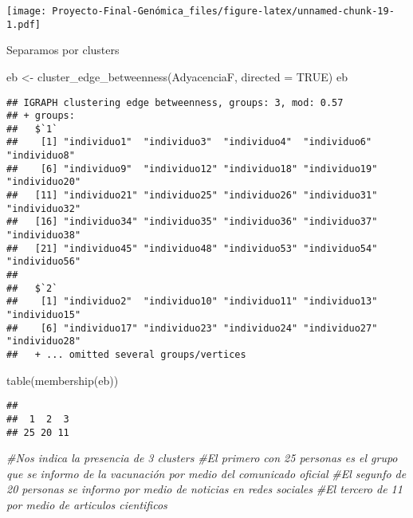 \documentclass[
]{article}
\newenvironment{Shaded}{\begin{snugshade}}{\end{snugshade}}
\newcommand{\AttributeTok}[1]{\textcolor[rgb]{0.77,0.63,0.00}{#1}}
\newcommand{\CommentTok}[1]{\textcolor[rgb]{0.56,0.35,0.01}{\textit{#1}}}
\newcommand{\ConstantTok}[1]{\textcolor[rgb]{0.00,0.00,0.00}{#1}}
\newcommand{\FunctionTok}[1]{\textcolor[rgb]{0.00,0.00,0.00}{#1}}
\newcommand{\NormalTok}[1]{#1}
\newcommand{\OtherTok}[1]{\textcolor[rgb]{0.56,0.35,0.01}{#1}}
\begin{document}
\texttt{[image: Proyecto-Final-Genómica\_files/figure-latex/unnamed-chunk-19-1.pdf]}

Separamos por clusters

\begin{Shaded}
\begin{Highlighting}[]
\NormalTok{eb }\OtherTok{\textless{}{-}} \FunctionTok{cluster\_edge\_betweenness}\NormalTok{(AdyacenciaF, }\AttributeTok{directed =} \ConstantTok{TRUE}\NormalTok{)}
\NormalTok{eb}
\end{Highlighting}
\end{Shaded}

\begin{verbatim}
## IGRAPH clustering edge betweenness, groups: 3, mod: 0.57
## + groups:
##   $`1`
##    [1] "individuo1"  "individuo3"  "individuo4"  "individuo6"  "individuo8" 
##    [6] "individuo9"  "individuo12" "individuo18" "individuo19" "individuo20"
##   [11] "individuo21" "individuo25" "individuo26" "individuo31" "individuo32"
##   [16] "individuo34" "individuo35" "individuo36" "individuo37" "individuo38"
##   [21] "individuo45" "individuo48" "individuo53" "individuo54" "individuo56"
##   
##   $`2`
##    [1] "individuo2"  "individuo10" "individuo11" "individuo13" "individuo15"
##    [6] "individuo17" "individuo23" "individuo24" "individuo27" "individuo28"
##   + ... omitted several groups/vertices
\end{verbatim}

\begin{Shaded}
\begin{Highlighting}[]
\FunctionTok{table}\NormalTok{(}\FunctionTok{membership}\NormalTok{(eb))}
\end{Highlighting}
\end{Shaded}

\begin{verbatim}
## 
##  1  2  3 
## 25 20 11
\end{verbatim}

\begin{Shaded}
\begin{Highlighting}[]
\CommentTok{\#Nos indica la presencia de 3 clusters}
\CommentTok{\#El primero con 25 personas es el grupo que se informo de la vacunación por medio del comunicado oficial}
\CommentTok{\#El segunfo de 20 personas se informo por medio de noticias en redes sociales}
\CommentTok{\#El tercero de 11 por medio de articulos cientificos}
\end{Highlighting}
\end{Shaded}
\end{document}
